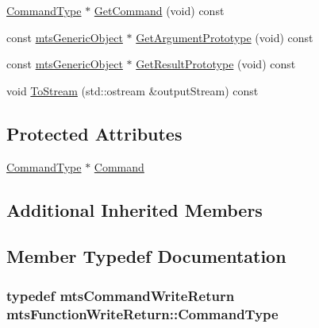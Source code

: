 \begin{DoxyCompactItemize}
\item 
\hyperlink{classmts_function_write_return_ac896d3571d680531a898daf398774881}{Command\-Type} $\ast$ \hyperlink{classmts_function_write_return_a9538b7e6a7bc2656be89e70b9cc6f2f2}{Get\-Command} (void) const 
\item 
const \hyperlink{classmts_generic_object}{mts\-Generic\-Object} $\ast$ \hyperlink{classmts_function_write_return_a36b02957cee1e6f144377862aa5c8819}{Get\-Argument\-Prototype} (void) const 
\item 
const \hyperlink{classmts_generic_object}{mts\-Generic\-Object} $\ast$ \hyperlink{classmts_function_write_return_a13ce482e4e34283e27f63654a61c3e67}{Get\-Result\-Prototype} (void) const 
\item 
void \hyperlink{classmts_function_write_return_a4cb7b8d402ca8863ccd6524253cb735f}{To\-Stream} (std\-::ostream \&output\-Stream) const 
\end{DoxyCompactItemize}
\subsection*{Protected Attributes}
\begin{DoxyCompactItemize}
\item 
\hyperlink{classmts_function_write_return_ac896d3571d680531a898daf398774881}{Command\-Type} $\ast$ \hyperlink{classmts_function_write_return_af81a9d61a27ec87109ad4cf07b7ba6ea}{Command}
\end{DoxyCompactItemize}
\subsection*{Additional Inherited Members}


\subsection{Member Typedef Documentation}
\hypertarget{classmts_function_write_return_ac896d3571d680531a898daf398774881}{
\subsubsection[{Command\-Type}]{\setlength{\rightskip}{0pt plus 5cm}typedef {\bf mts\-Command\-Write\-Return} {\bf mts\-Function\-Write\-Return\-::\-Command\-Type}}}\label{classmts_function_write_return_ac896d3571d680531a898daf398774881}


